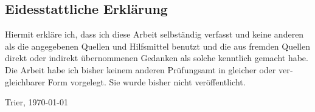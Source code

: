 \begin{otherlanguage}{ngerman}

	\chapter*{Eidesstattliche Erklärung}

	Hiermit erkläre ich, dass ich diese Arbeit selbständig verfasst und keine anderen als die angegebenen Quellen und Hilfsmittel benutzt und die aus fremden Quellen direkt oder indirekt übernommenen Gedanken als solche kenntlich gemacht habe.
	Die Arbeit habe ich bisher keinem anderen Prüfungsamt in gleicher oder vergleichbarer Form vorgelegt.
	Sie wurde bisher nicht veröffentlicht.

	\bigskip

	\noindent
	Trier, \today


\end{otherlanguage}
